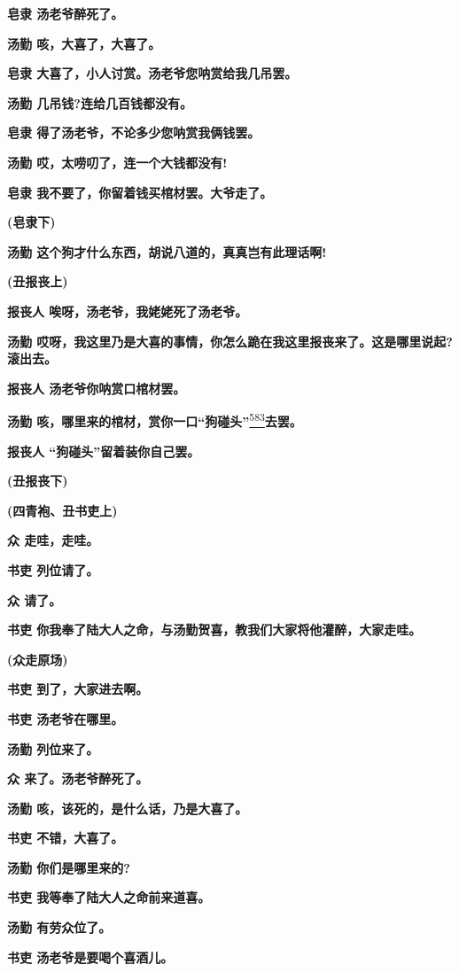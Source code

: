 \textbf{皂隶 汤老爷醉死了。}

\textbf{汤勤 咳，大喜了，大喜了。}

\textbf{皂隶 大喜了，小人讨赏。汤老爷您呐赏给我几吊罢。}

\textbf{汤勤 几吊钱?连给几百钱都没有。}

\textbf{皂隶 得了汤老爷，不论多少您呐赏我俩钱罢。}

\textbf{汤勤 哎，太唠叨了，连一个大钱都没有!}

\textbf{皂隶 我不要了，你留着钱买棺材罢。大爷走了。}

\textbf{(皂隶下)}

\textbf{汤勤 这个狗才什么东西，胡说八道的，真真岂有此理话啊!}

\textbf{(丑报丧上)}

\textbf{报丧人 唉呀，汤老爷，我姥姥死了汤老爷。}

\textbf{汤勤
哎呀，我这里乃是大喜的事情，你怎么跪在我这里报丧来了。这是哪里说起?滚出去。}

\textbf{报丧人 汤老爷你呐赏口棺材罢。}

\textbf{汤勤
咳，哪里来的棺材，赏你一口``狗碰头''}\protect\hyperlink{fn583}{\textsuperscript{583}}\textbf{去罢。}

\textbf{报丧人 ``狗碰头''留着装你自己罢。}

\textbf{(丑报丧下)}

\textbf{(四青袍、丑书吏上)}

\textbf{众 走哇，走哇。}

\textbf{书吏 列位请了。}

\textbf{众 请了。}

\textbf{书吏
你我奉了陆大人之命，与汤勤贺喜，教我们大家将他灌醉，大家走哇。}

\textbf{(众走原场)}

\textbf{书吏 到了，大家进去啊。}

\textbf{书吏 汤老爷在哪里。}

\textbf{汤勤 列位来了。}

\textbf{众 来了。汤老爷醉死了。}

\textbf{汤勤 咳，该死的，是什么话，乃是大喜了。}

\textbf{书吏 不错，大喜了。}

\textbf{汤勤 你们是哪里来的?}

\textbf{书吏 我等奉了陆大人之命前来道喜。}

\textbf{汤勤 有劳众位了。}

\textbf{书吏 汤老爷是要喝个喜酒儿。}

